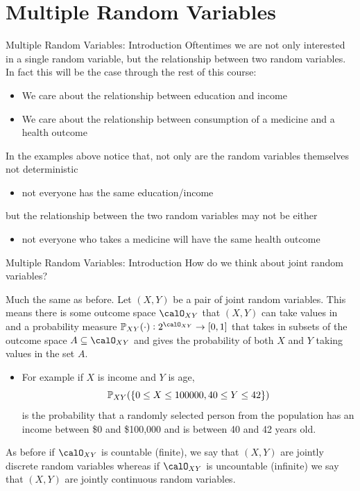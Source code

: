 \documentclass[notheorems,9pt, handout]{beamer}
\begin{document}
\section{Multiple Random Variables}
\begin{frame}{Multiple Random Variables: Introduction} 
	\label{frame:mrv-intro1}
	Oftentimes we are not only interested in a single random variable, but the relationship between two random variables. In fact this will be the case through the rest of this course:
	\begin{itemize}
		\item We care about the relationship between education and income
		\item We care about the relationship between consumption of a medicine and a health outcome
	\end{itemize}
	In the examples above notice that, not only are the random variables themselves not deterministic 
	\begin{itemize}
		\item not everyone has the same education/income
	\end{itemize}
	but the relationship between the two random variables may not be either
	\begin{itemize}
		\item not everyone who takes a medicine will have the same health outcome
	\end{itemize}
\end{frame}
\begin{frame}{Multiple Random Variables: Introduction} 
	\label{frame:mrv-intro2}
	 How do we think about joint random variables?

	 Much the same as before. Let \((X,Y)\) be a pair of joint random variables. This means there is some outcome space \(\calO_{XY}\) that \((X,Y)\) can take values in and a probability measure \(\P_{XY}(\cdot): 2^{\calO_{XY}}\to[0,1]\) that takes in subsets of the outcome space \(A\subseteq \calO_{XY}\) and gives the probability of both \(X\) and \(Y\) taking values in the set \(A\).
	\begin{itemize}
		\item For example if \(X\) is income and \(Y\) is age, \[\P_{XY}(\{0\leq X\leq 100000, 40\leq Y\leq 42\})\] is the probability that a randomly selected person from the population has an income between \$0 and \$100,000 and is between 40 and 42 years old.
	\end{itemize}
	As before if \(\calO_{XY}\) is countable (finite), we say that \((X,Y)\) are jointly discrete random variables whereas if \(\calO_{XY}\) is uncountable (infinite) we say that \((X,Y)\) are jointly continuous random variables.
\end{frame}
\end{document}
